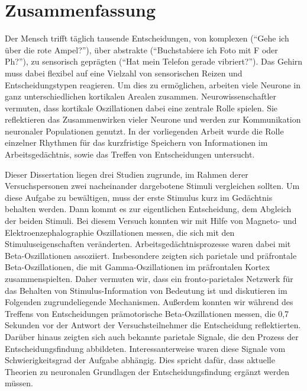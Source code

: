 
\chapter*{Zusammenfassung}
\doublespacing
Der Mensch trifft täglich tausende Entscheidungen, von komplexen ("`Gehe ich über die rote Ampel?"'), über abstrakte ("`Buchstabiere ich Foto mit F oder Ph?"'), zu sensorisch geprägten ("`Hat mein Telefon gerade vibriert?"'). Das Gehirn muss dabei flexibel auf eine Vielzahl von sensorischen Reizen und Entscheidungstypen reagieren. Um dies zu ermöglichen, arbeiten viele Neurone in ganz unterschiedlichen kortikalen Arealen zusammen. Neurowissenschaftler vermuten, dass kortikale Oszillationen dabei eine zentrale Rolle spielen. Sie reflektieren das Zusammenwirken vieler Neurone und werden zur Kommunikation neuronaler Populationen genutzt. In der vorliegenden Arbeit wurde die Rolle einzelner Rhythmen für das kurzfristige Speichern von Informationen im Arbeitsgedächtnis, sowie das Treffen von Entscheidungen untersucht.

Dieser Dissertation liegen drei Studien zugrunde, im Rahmen derer Versuchspersonen zwei nacheinander dargebotene Stimuli vergleichen sollten. Um diese Aufgabe zu bewältigen, muss der erste Stimulus kurz im Gedächtnis behalten werden. Dann kommt es zur eigentlichen Entscheidung, dem Abgleich der  beiden Stimuli. Bei diesem Versuch konnten wir mit Hilfe von Magneto- und Elektroenzephalographie Oszillationen messen, die sich mit den Stimuluseigenschaften veränderten. Arbeitsgedächtnisprozesse waren dabei mit Beta-Oszillationen assoziiert. Insbesondere zeigten sich parietale und präfrontale Beta-Oszillationen, die mit Gamma-Oszillationen im präfrontalen Kortex zusammenspielten. Daher vermuten wir, dass ein fronto-parietales Netzwerk für das Behalten von Stimulus-Information von Bedeutung ist und diskutieren im Folgenden zugrundeliegende Mechanismen. Außerdem konnten wir während des Treffens von Entscheidungen prämotorische Beta-Oszillationen messen, die 0,7 Sekunden vor der Antwort der Versuchsteilnehmer die Entscheidung reflektierten. Darüber hinaus zeigten sich auch bekannte parietale Signale, die den Prozess der Entscheidungsfindung abbildeten. Interessanterweise waren diese Signale vom Schwierigkeitsgrad der Aufgabe abhängig. Dies spricht dafür, dass aktuelle Theorien zu neuronalen Grundlagen der Entscheidungsfindung ergänzt werden müssen.